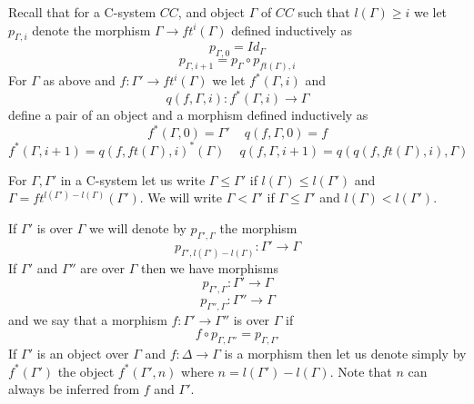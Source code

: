 \documentclass[11pt]{article}
\newcommand{\sr}{\rightarrow}
\newcommand{\spc}{{\,\,\,\,\,\,\,}}
\begin{document}
%
Recall that for a C-system $CC$, and object $\Gamma$ of $CC$ such that $l(\Gamma)\ge i$ we let $p_{\Gamma,i}$ denote the morphism $\Gamma\sr ft^i(\Gamma)$ defined inductively as
%
$$p_{\Gamma,0}=Id_{\Gamma}$$
$$p_{\Gamma,i+1}=p_{\Gamma}\circ p_{ft(\Gamma),i}$$
%
For $\Gamma$ as above and $f:\Gamma'\sr ft^i(\Gamma)$ we let $f^*(\Gamma,i)$ and 
%
$$q(f,\Gamma,i):f^*(\Gamma,i)\sr \Gamma$$ 
%
define a pair of an object and a morphism defined inductively as
%
$$f^*(\Gamma,0)=\Gamma'\spc q(f,\Gamma,0)=f$$
$$f^*(\Gamma, i+1)=q(f,ft(\Gamma),i)^*(\Gamma)\spc q(f,\Gamma,i+1)=q(q(f,ft(\Gamma),i),\Gamma)$$
%

For $\Gamma,\Gamma'$ in a C-system let us write $\Gamma\le \Gamma'$ if $l(\Gamma)\le l(\Gamma')$ and $\Gamma=ft^{l(\Gamma')-l(\Gamma)}(\Gamma')$. We will write $\Gamma<\Gamma'$ if $\Gamma\le \Gamma'$ and $l(\Gamma)<l(\Gamma')$. 

If $\Gamma'$ is over $\Gamma$ we will denote by $p_{\Gamma',\Gamma}$ the morphism
%
$$p_{\Gamma',l(\Gamma')-l(\Gamma)}:\Gamma'\sr \Gamma$$
%
If $\Gamma'$ and $\Gamma''$ are over $\Gamma$ then we have morphisms 
%
$$p_{\Gamma',\Gamma}:\Gamma'\sr \Gamma$$
$$p_{\Gamma'',\Gamma}:\Gamma''\sr\Gamma$$
%
and we say that a morphism $f:\Gamma'\sr \Gamma''$ is over $\Gamma$ if 
%
$$f\circ p_{\Gamma,\Gamma''}=p_{\Gamma,\Gamma'}$$
%
If $\Gamma'$ is an object over $\Gamma$ and  $f:\Delta\sr \Gamma$ is a morphism then let us denote simply by $f^*(\Gamma')$ the object $f^*(\Gamma',n)$ where $n=l(\Gamma')-l(\Gamma)$. Note that $n$ can always be inferred from $f$ and $\Gamma'$. 
\end{document}
